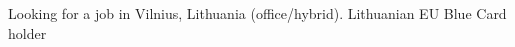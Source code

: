 \documentclass[letter,10pt]{article}
\begin{document}
Looking for a job in Vilnius, Lithuania (office/hybrid). Lithuanian EU Blue Card holder\\
\end{document}
